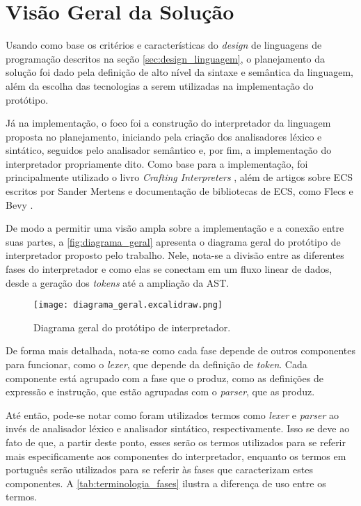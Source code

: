 \section{Visão Geral da Solução}

Usando como base os critérios e características do \textit{design} de linguagens de programação descritos na seção \ref{sec:design_linguagem}, o planejamento da solução foi dado pela definição de alto nível da sintaxe e semântica da linguagem, além da escolha das tecnologias a serem utilizadas na implementação do protótipo.

Já na implementação, o foco foi a construção do interpretador da linguagem proposta no planejamento, iniciando pela criação dos analisadores léxico e sintático, seguidos pelo analisador semântico e, por fim, a implementação do interpretador propriamente dito. Como base para a implementação, foi principalmente utilizado o livro \textit{Crafting Interpreters} \cite{craftinginterpreters}, além de artigos sobre ECS escritos por Sander Mertens e documentação de bibliotecas de ECS, como Flecs \cite{flecs} e Bevy \cite{bevy}.

De modo a permitir uma visão ampla sobre a implementação e a conexão entre suas partes, a \autoref{fig:diagrama_geral} apresenta o diagrama geral do protótipo de interpretador proposto pelo trabalho. Nele, nota-se a divisão entre as diferentes fases do interpretador e como elas se conectam em um fluxo linear de dados, desde a geração dos \textit{tokens} até a ampliação da AST.

\begin{figure}[H]
	\centering
	\texttt{[image: diagrama\_geral.excalidraw.png]}
	\caption{Diagrama geral do protótipo de interpretador.}
	\label{fig:diagrama_geral}
\end{figure}

De forma mais detalhada, nota-se como cada fase depende de outros componentes para funcionar, como o \textit{lexer}, que depende da definição de \textit{token}. Cada componente está agrupado com a fase que o produz, como as definições de expressão e instrução, que estão agrupadas com o \textit{parser}, que as produz.

Até então, pode-se notar como foram utilizados termos como \textit{lexer} e \textit{parser} ao invés de analisador léxico e analisador sintático, respectivamente. Isso se deve ao fato de que, a partir deste ponto, esses serão os termos utilizados para se referir mais especificamente aos componentes do interpretador, enquanto os termos em português serão utilizados para se referir às fases que caracterizam estes componentes. A \autoref{tab:terminologia_fases} ilustra a diferença de uso entre os termos.

